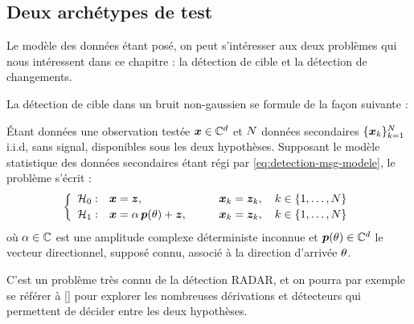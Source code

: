 \subsection{Deux archétypes de test}
\label{subsec:detection-archetypes}

%

Le modèle des données étant posé, on peut s'intéresser aux deux problèmes qui nous intéressent dans ce chapitre : la détection de cible et la détection de changements.


La détection de cible dans un bruit non-gaussien se formule de la façon suivante :
\begin{definition}
\label{def:detection-archetype-cible}
Étant données une observation testée $\boldsymbol{x}\in\mathbb{C}^{d}$ et $N$ données secondaires $\{\boldsymbol{x}_k\}_{k=1}^{N}$ i.i.d, sans signal, disponibles sous les deux hypothèses. Supposant le modèle statistique des données secondaires étant régi par \cref{eq:detection-msg-modele}, le problème s'écrit :
  \begin{equation}
    \left\{
    \begin{array}{lll}
      \mathcal{H}_0: & \boldsymbol{x} = \boldsymbol{z}, & \boldsymbol{x}_k = \boldsymbol{z}_k, \quad k\in\{1,\dots,N\} \\[2pt]
      \mathcal{H}_1: & \boldsymbol{x} = \alpha\,\boldsymbol{p}(\theta) + \boldsymbol{z}, \qquad & \boldsymbol{x}_k = \boldsymbol{z}_k, \quad k\in\{1,\dots,N\}
    \end{array}
    \right.
    \label{eq:detection-test}
  \end{equation}
  où $\alpha\in\mathbb{C}$ est une amplitude complexe déterministe inconnue et $\boldsymbol{p}(\theta)\in\mathbb{C}^{d}$ le vecteur directionnel, supposé connu, associé à la direction d'arrivée $\theta$.
\end{definition}

C'est un problème très connu de la détection RADAR, et on pourra par exemple se référer à [] pour explorer les nombreuses dérivations et détecteurs qui permettent de décider entre les deux hypothèses.


